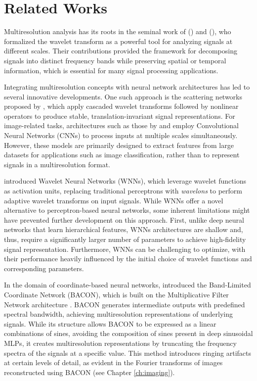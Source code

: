 \section{Related Works}

Multiresolution analysis has its roots in the seminal work of (\cite{mallat1989theory}) and (\cite{daubechies92}), who formalized the wavelet transform as a powerful tool for analyzing signals at different scales. Their contributions provided the framework for decomposing signals into distinct frequency bands while preserving spatial or temporal information, which is essential for many signal processing applications.

Integrating multiresolution concepts with neural network architectures has led to several innovative developments. One such approach is the scattering networks proposed by \citet{bruna2013}, which apply cascaded wavelet transforms followed by nonlinear operators to produce stable, translation-invariant signal representations. For image-related tasks, architectures such as those by \citet{sppHe2015} and \citet{YuKoltun2016} employ Convolutional Neural Networks (CNNs) to process inputs at multiple scales simultaneously. However, these models are primarily designed to extract features from large datasets for applications such as image classification, rather than to represent signals in a multiresolution format.

\citet{zhangWavelet92} introduced Wavelet Neural Networks (WNNs), which leverage wavelet functions as activation units, replacing traditional perceptrons with \textit{wavelons} to perform adaptive wavelet transforms on input signals. While WNNs offer a novel alternative to perceptron-based neural networks, some inherent limitations might have prevented further development on this approach. First, unlike deep neural networks that learn hierarchical features, WNNs architectures are shallow and, thus, require a significantly larger number of parameters to achieve high-fidelity signal representation. Furthermore, WNNs can be challenging to optimize, with their performance heavily influenced by the initial choice of wavelet functions and corresponding parameters.

In the domain of coordinate-based neural networks, \citet{bacon2021} introduced the Band-Limited Coordinate Network (BACON), which is built on the Multiplicative Filter Network architecture \citep{fathony2020multiplicative}. BACON generates intermediate outputs with predefined spectral bandwidth, achieving multiresolution representations of underlying signals. While its structure allows BACON to be expressed as a linear combinations of sines, avoiding the composition of sines present in deep sinusoidal MLPs, it creates multiresolution representations by truncating the frequency spectra of the signals at a specific value. This method introduces ringing artifacts at certain levels of detail, as evident in the Fourier transforms of images reconstructed using BACON (see Chapter \ref{ch:imaging}).

